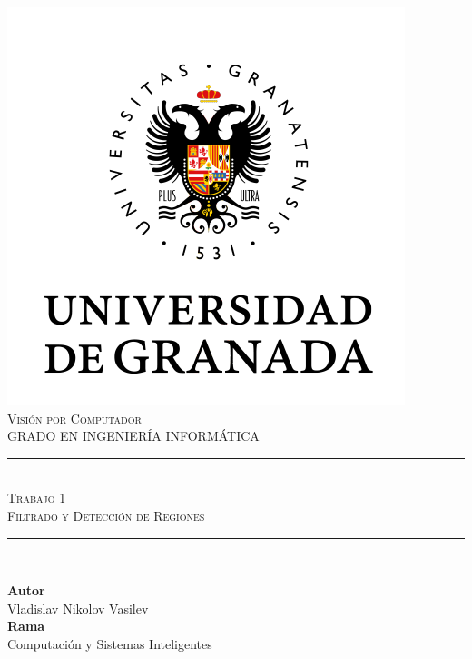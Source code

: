 \documentclass[11pt,a4paper]{article}
\newcommand{\asignatura}{Visión por Computador}
\newcommand{\autor}{Vladislav Nikolov Vasilev}
\newcommand{\titulo}{Trabajo 1}
\newcommand{\subtitulo}{Filtrado y Detección de Regiones}
\begin{document}

\begin{titlepage}

\begin{minipage}{\textwidth}

\centering

\includegraphics[scale=0.5]{img/ugr.png}\\

\textsc{\Large \asignatura{}\\[0.2cm]}
\textsc{GRADO EN INGENIERÍA INFORMÁTICA}\\[1cm]

\noindent\rule[-1ex]{\textwidth}{1pt}\\[1.5ex]
\textsc{{\Huge \titulo\\[0.5ex]}}
\textsc{{\Large \subtitulo\\}}
\noindent\rule[-1ex]{\textwidth}{2pt}\\[3.5ex]

\end{minipage}

\vspace{0.5cm}

\begin{minipage}{\textwidth}

\centering

\textbf{Autor}\\ {\autor{}}\\[2.5ex]
\textbf{Rama}\\ {Computación y Sistemas Inteligentes}\\[2.5ex]
\vspace{0.3cm}


\end{minipage}
\end{titlepage}
\end{document}
